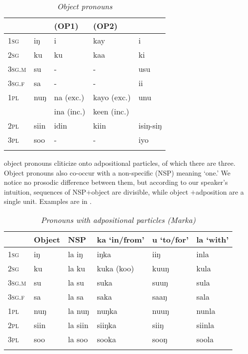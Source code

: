 \documentclass[output=paper]{LSP/langsci}
\begin{document}
 \begin{table}
 	\caption{\textit{Object pronouns}}
 	\label{tab:1:Object pronouns}
 	\begin{tabularx}{\textwidth}{Xllll} 
 		\lsptoprule
 		& \ili{Marka}  & \ili{Somali} (OP1) & \ili{Somali} (OP2) & \ili{Maay}   \\ 
 		\midrule
 		1\textsc{sg} & iŋ & i & kay & i \\
 		2\textsc{sg} & ku  & ku & kaa  & ki  \\
 		3\textsc{sg.m} & su & - & - & usu \\
 		3\textsc{sg.f} & sa & - & - & ii \\
 		1\textsc{pl} & nuŋ & na (exc.) & kayo (exc.) & unu \\
 		& & ina (inc.) & keen (inc.) &  \\
 		2\textsc{pl} & siin & idin & kiin & isiŋ-siŋ  \\
 		3\textsc{pl} & soo & - & - & iyo \\
 		\lspbottomrule
 	\end{tabularx}
 \end{table}
 
  object pronouns cliticize onto adpositional particles, of which there are three. Object pronouns also co-occur with a non-specific  (NSP) meaning `one.' We notice no prosodic difference between them, but according to our speaker's intuition, sequences of NSP$+$object  are divisible, while object $+$adposition are a single unit. Examples are in .\\
 
\vspace{12pt} 
\begin{table}
 	\caption{\textit{Pronouns with adpositional particles (Marka)}}
 	\label{tab:1:Pronouns Adpositions}
 	\begin{tabularx}{\textwidth}{Xlllll} 
 		\lsptoprule
 		& Object \isi{pronoun} & NSP  & ka `in/from' & u `to/for' & la `with' \\ 
 		\midrule
 		1\textsc{sg} & iŋ & la iŋ & iŋka & iiŋ & inla \\
 		2\textsc{sg} & ku  & la ku & kuka (koo)  & kuuŋ & kula  \\
 		3\textsc{sg.m} & su & la su & suka & suuŋ & sula \\
 		3\textsc{sg.f} & sa & la sa & saka & saaŋ & sala \\
 		1\textsc{pl} & nuŋ & la nuŋ & nuŋka & nuuŋ & nunla \\
 		2\textsc{pl} & siin & la siin & siiŋka & siiŋ & siinla  \\
 		3\textsc{pl} & soo & la soo & sooka & sooŋ & soola \\
 		\lspbottomrule
 	\end{tabularx}
 \end{table}
 
\end{document}
